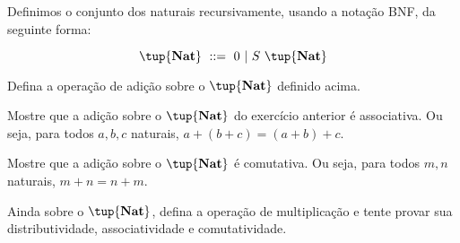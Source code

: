\begin{definition}[Naturais]
    Definimos o conjunto dos naturais recursivamente, usando a notação BNF, da
    seguinte forma:

    $$ \tup{\textbf{Nat}}\ ::=\ 0\ \vert\ S\ \tup{\textbf{Nat}} $$

\end{definition}

\begin{exercise}
    Defina a operação de adição sobre o $ \tup{\textbf{Nat}} $ definido acima.
\end{exercise}

\begin{exercise}
    Mostre que a adição sobre o $ \tup{\textbf{Nat}} $ do exercício anterior é
    associativa. Ou seja, para todos $a, b, c$ naturais, $a + (b + c) = (a + b)
    + c$.
\end{exercise}

\begin{homework}
    Mostre que a adição sobre o $ \tup{\textbf{Nat}} $ é comutativa. Ou seja,
    para todos $m, n$ naturais, $m + n = n + m$.
\end{homework}

\begin{homework}
    Ainda sobre o $ \tup{\textbf{Nat}} $, defina a operação de multiplicação e
    tente provar sua distributividade, associatividade e comutatividade.
\end{homework}
